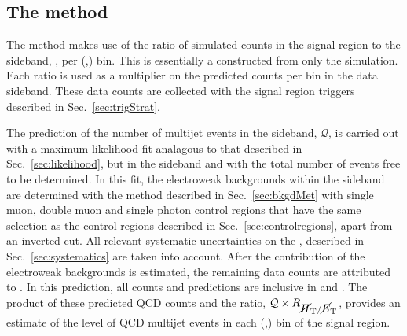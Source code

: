 \subsection{The method}
\label{sec:qcdMethod}

The method makes use of the ratio of simulated \QCD counts in the
signal region to the \mhtmet sideband, \rmhtmet, per (\HT,\nj) bin.
This is essentially a \TF constructed from only the \QCD simulation.
Each ratio is used as a multiplier on the predicted \QCD counts per
bin in the \mhtmet data sideband.  These data counts are collected
with the signal region triggers described in Sec.~\ref{sec:trigStrat}. 

The prediction of the number of \QCD multijet events in
the sideband, $\mathcal{Q}$, is carried out with a maximum likelihood fit analagous to
that described in Sec.~\ref{sec:likelihood}, but in the \mhtmet
sideband and with the total number of \QCD events free to be
determined. In this fit,
the electroweak backgrounds within the sideband are determined with the method described
in Sec.~\ref{sec:bkgdMet} with single muon, double muon and single
photon control regions that have the same selection as the control
regions described in Sec.~\ref{sec:controlregions}, apart from an inverted
\mhtmet cut. All relevant systematic uncertainties on the \TFs,
described in Sec.~\ref{sec:systematics} are taken into account.  After the
contribution of the electroweak backgrounds is estimated, the
remaining data counts are attributed to \QCD. In this prediction, all
counts and predictions are inclusive in \nb and \MHT. The product of these
predicted QCD counts and the ratio, $\mathcal{Q} \times \mbox{$R_{\mbox{$\cancel{H}_\text{T}$} / \mbox{$\cancel{E}_\text{T}$}}$}$,
provides an estimate of the level of QCD multijet events in each
(\HT,\nj) bin of the signal region. 

